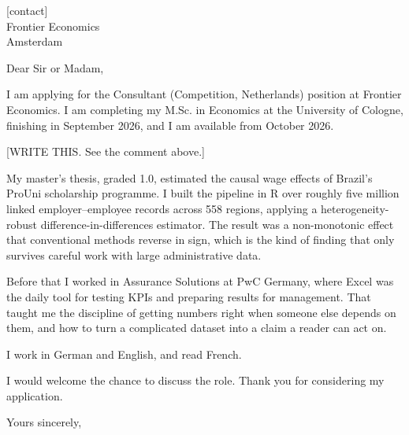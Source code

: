 \documentclass[a4paper,11pt]{letter}
\begin{document}
\begin{letter}{%
    [contact] \\
    Frontier Economics \\
    Amsterdam
}

\opening{Dear Sir or Madam,}

I am applying for the Consultant (Competition, Netherlands) position at Frontier Economics. I am completing my M.Sc. in Economics at the University of Cologne, finishing in September 2026, and I am available from October 2026.

%

[WRITE THIS. See the comment above.]

My master's thesis, graded 1.0, estimated the causal wage effects of Brazil's ProUni scholarship programme. I built the pipeline in R over roughly five million linked employer--employee records across 558 regions, applying a heterogeneity-robust difference-in-differences estimator. The result was a non-monotonic effect that conventional methods reverse in sign, which is the kind of finding that only survives careful work with large administrative data.

Before that I worked in Assurance Solutions at PwC Germany, where Excel was the daily tool for testing KPIs and preparing results for management. That taught me the discipline of getting numbers right when someone else depends on them, and how to turn a complicated dataset into a claim a reader can act on.

I work in German and English, and read French.

I would welcome the chance to discuss the role. Thank you for considering my application.

\closing{Yours sincerely,}

\end{letter}
\end{document}
